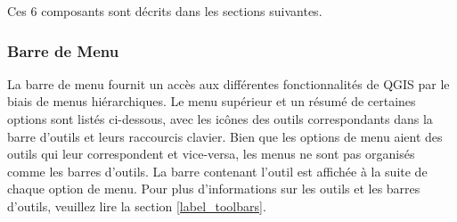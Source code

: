 Ces 6 composants sont décrits dans les sections suivantes.

%

\subsubsection{Barre de Menu}\label{label_menubar}

La barre de menu fournit un accès aux différentes fonctionnalités de QGIS par le biais de menus hiérarchiques. Le menu supérieur et un résumé de certaines options sont listés ci-dessous, avec les icônes des outils correspondants dans la barre d'outils et leurs raccourcis clavier. Bien que les options de menu aient des outils qui leur correspondent et vice-versa, les menus ne sont pas organisés comme les barres d'outils. La barre contenant l'outil est affichée à la suite de chaque option de menu. Pour plus d'informations sur les outils et les barres d'outils, veuillez lire la section \ref{label_toolbars}.

